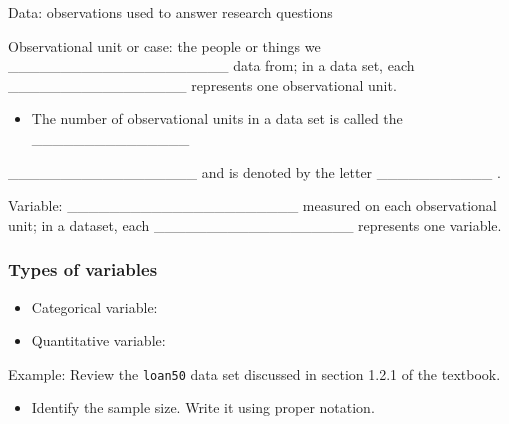\documentclass[
]{report}
\providecommand{\tightlist}{%
  \setlength{\itemsep}{0pt}\setlength{\parskip}{0pt}}
\begin{document}

Data: observations used to answer research questions

Observational unit or case: the people or things we \_\_\_\_\_\_\_\_\_\_\_\_\_\_\_\_\_\_\_\_\_ data from; in a data set, each \_\_\_\_\_\_\_\_\_\_\_\_\_\_\_\_\_ represents one observational unit.

\begin{itemize}
\tightlist
\item
  The number of observational units in a data set is called the \_\_\_\_\_\_\_\_\_\_\_\_\_\_\_
\end{itemize}

\_\_\_\_\_\_\_\_\_\_\_\_\_\_\_\_\_\_ and is denoted by the letter \_\_\_\_\_\_\_\_\_\_\_ .

Variable: \_\_\_\_\_\_\_\_\_\_\_\_\_\_\_\_\_\_\_\_\_\_ measured on each observational unit; in a dataset, each \_\_\_\_\_\_\_\_\_\_\_\_\_\_\_\_\_\_\_ represents one variable.


\subsubsection*{Types of variables}\label{types-of-variables}

\begin{itemize}
\tightlist
\item
  Categorical variable:
\end{itemize}

\vspace{0.5in}


\begin{itemize}
\tightlist
\item
  Quantitative variable:
\end{itemize}

\vspace{0.5in}

Example: Review the \texttt{loan50} data set discussed in section 1.2.1 of the textbook.

\begin{itemize}
\tightlist
\item
  Identify the sample size. Write it using proper notation.
\end{itemize}

\vspace{0.2in}
\end{document}
